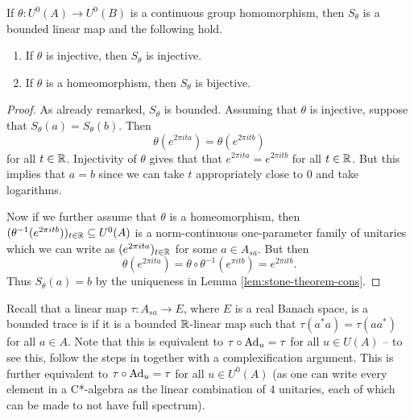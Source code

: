 \documentclass[12pt]{amsart}
\begin{document}
\begin{lemma}\label{lem:sa-bijective}
If $\theta:U^0(A) \to U^0(B)$ is a continuous group homomorphism, then $S_\theta$ is a bounded linear map and the following hold.
\begin{enumerate}
\item If $\theta$ is injective, then $S_\theta$ is injective. 
\item If $\theta$ is a homeomorphism, then $S_\theta$ is bijective.
\end{enumerate}
\begin{proof}
As already remarked, $S_\theta$ is bounded. Assuming that $\theta$ is injective, suppose that $S_\theta(a) = S_\theta(b)$. Then
\begin{equation}
\theta(e^{2\pi i t a}) = \theta(e^{2\pi i t b})
\end{equation}
for all $t \in \mathbb{R}$. Injectivity of $\theta$ gives that that $e^{2\pi i t a} = e^{2\pi i t b}$ for all $t \in \mathbb{R}$. But this implies that $a = b$ since we can take $t$ appropriately close to 0 and take logarithms. 

Now if we further assume that $\theta$ is a homeomorphism, then $(\theta^{-1}(e^{2\pi i t b}))_{t \in \mathbb{R}} \subseteq U^0(A)$ is a norm-continuous one-parameter family of unitaries which we can write as $(e^{2\pi i t a})_{t \in \mathbb{R}}$ for some $a \in A_{sa}$. But then
\begin{equation}
\theta(e^{2\pi i t a}) = \theta \circ \theta^{-1}(e^{\pi i t b}) = e^{2\pi i t b}.
\end{equation}
Thus $S_\theta(a) = b$ by the uniqueness in Lemma \ref{lem:stone-theorem-cons}.
\end{proof}
\end{lemma}

Recall that a linear map $\tau: A_{sa} \to E$, where $E$ is a real Banach space, is a bounded trace is if it is a bounded $\mathbb{R}$-linear map such that $\tau(a^*a) = \tau(aa^*)$ for all $a \in A$. Note that this is equivalent to $\tau \circ \text{Ad}_u = \tau$ for all $u \in U(A)$ -- to see this, follow the steps in \cite[Exercise 3.6]{RordamKBook} together with a complexification argument. This is further equivalent to $\tau \circ \text{Ad}_u = \tau$ for all $u \in U^0(A)$ (as one can write every element in a C*-algebra as the linear combination of 4 unitaries, each of which can be made to not have full spectrum). 
\end{document}
